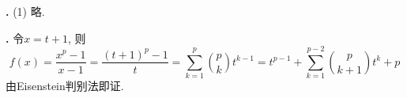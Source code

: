 \par \textbf{\thesolpoly .} (1) 略. 

\par \textbf{\thesolpoly .} \cite{GTS} 令$x=t+1$, 则
\begin{equation}
    f(x)=\frac{x^p-1}{x-1}=\frac{(t+1)^p-1}{t} = \sum_{k=1}^p \binom{p}{k} t^{k-1} = t^{p-1} + \sum_{k=1}^{p-2} \binom{p}{k+1} t^{k} + p
\end{equation}
由Eisenstein判别法即证. 